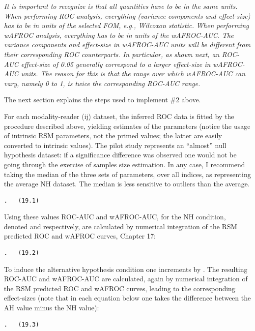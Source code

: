 \documentclass[
]{book}
\begin{document}
\emph{It is important to recognize is that all quantities have to be in the same units. When performing ROC analysis, everything (variance components and effect-size) has to be in units of the selected FOM, e.g., Wilcoxon statistic. When performing wAFROC analysis, everything has to be in units of the wAFROC-AUC. The variance components and effect-size in wAFROC-AUC units will be different from their corresponding ROC counterparts. In particular, as shown next, an ROC-AUC effect-size of 0.05 generally correspond to a larger effect-size in wAFROC-AUC units. The reason for this is that the range over which wAFROC-AUC can vary, namely 0 to 1, is twice the corresponding ROC-AUC range.}

The next section explains the steps used to implement \#2 above.

For each modality-reader (ij) dataset, the inferred ROC data is fitted by the procedure described above, yielding estimates of the parameters (notice the usage of intrinsic RSM parameters, not the primed values; the latter are easily converted to intrinsic values). The pilot study represents an ``almost'' null hypothesis dataset: if a significance difference was observed one would not be going through the exercise of samples size estimation. In any case, I recommend taking the median of the three sets of parameters, over all indices, as representing the average NH dataset. The median is less sensitive to outliers than the average.

\begin{verbatim}
.   (19.1)
\end{verbatim}

Using these values ROC-AUC and wAFROC-AUC, for the NH condition, denoted and respectively, are calculated by numerical integration of the RSM predicted ROC and wAFROC curves, Chapter 17:

\begin{verbatim}
.   (19.2)
\end{verbatim}

To induce the alternative hypothesis condition one increments by . The resulting ROC-AUC and wAFROC-AUC are calculated, again by numerical integration of the RSM predicted ROC and wAFROC curves, leading to the corresponding effect-sizes (note that in each equation below one takes the difference between the AH value minus the NH value):

\begin{verbatim}
.   (19.3)
\end{verbatim}
\end{document}
